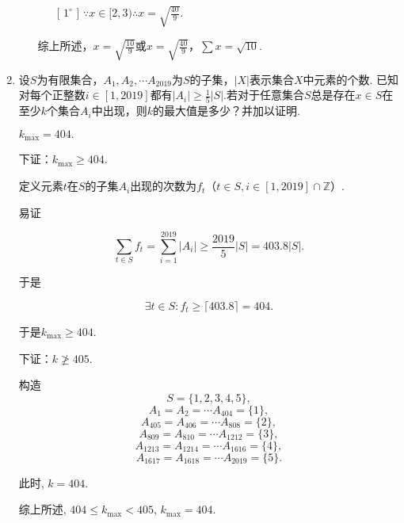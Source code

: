 \documentclass[8pt]{article}
\begin{document}
\begin{enumerate}
\begin{enumerate}
\begin{enumerate} [ $1^{\circ}$ ]
							$\because x\in[2,3) \therefore x=\sqrt{\frac{40}{9}}$.

					\end{enumerate}

					综上所述，$x=\sqrt{\frac{10}{9}}$或$x=\sqrt{\frac{40}{9}}$，$\sum{x}=\sqrt{10}$.

			\end{enumerate}

		\item
			设$S$为有限集合，$A_1, A_2, \cdots A_{2019}$为$S$的子集，$|X|$表示集合$X$中元素的个数. 已知对每个正整数$i\in[1,2019]$都有$\left|A_i\right|\geq\frac{1}{5}|S|$.若对于任意集合$S$总是存在$x\in S$在至少$k$个集合$A_i$中出现，则$k$的最大值是多少？并加以证明.

			$k_{\max}=404.$

			下证：$k_{\max} \geq 404$.

			定义元素$t$在$S$的子集$A_i$出现的次数为$f_t$（$t\in S, i \in [1,2019] \cap \mathbb{Z}$）.

			易证

			$$\sum_{t\in S}{f_t} = \sum_{i=1}^{2019}{\left|A_i\right|}\geq\frac{2019}{5}|S|=403.8|S|.$$

			于是

			$$\exists t \in S: f_t \geq \lceil 403.8 \rceil = 404.$$

			于是$k_{\max} \geq 404$.

			下证：$k \ngeq 405$.

			构造
			$$S=\{1,2,3,4,5\},$$
			$$A_1=A_2=\cdots A_{404}=\{1\},$$
			$$A_{405}=A_{406}=\cdots A_{808}=\{2\},$$
			$$A_{809}=A_{810}=\cdots A_{1212}=\{3\},$$
			$$A_{1213}=A_{1214}=\cdots A_{1616}=\{4\},$$
			$$A_{1617}=A_{1618}=\cdots A_{2019}=\{5\}.$$

			此时, $k=404$.

			综上所述, $404\leq k_{\max} < 405$, $k_{\max}=404$.

	\end{enumerate}
\end{document}
